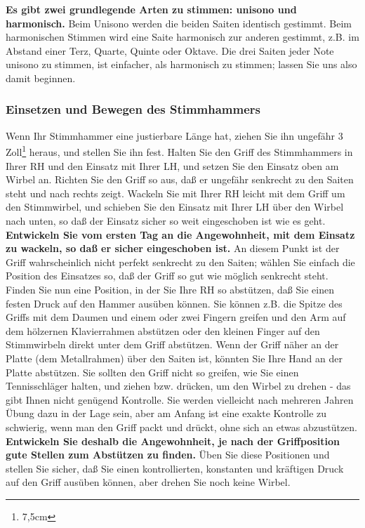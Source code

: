 \textbf{Es gibt zwei grundlegende Arten zu stimmen: unisono und harmonisch.}
Beim Unisono werden die beiden Saiten identisch gestimmt.
Beim harmonischen Stimmen wird eine Saite harmonisch zur anderen gestimmt, z.B. im Abstand einer Terz, Quarte, Quinte oder Oktave.
Die drei Saiten jeder Note unisono zu stimmen, ist einfacher, als harmonisch zu stimmen; lassen Sie uns also damit beginnen.
 

\label{c2_5b}
\subsubsection{Einsetzen und Bewegen des Stimmhammers}
\label{c2_5_hamm} 

Wenn Ihr Stimmhammer eine justierbare Länge hat, ziehen Sie ihn ungefähr 3 Zoll\footnote{7,5cm} heraus, und stellen Sie ihn fest.
Halten Sie den Griff des Stimmhammers in Ihrer RH und den Einsatz mit Ihrer LH, und setzen Sie den Einsatz oben am Wirbel an.
Richten Sie den Griff so aus, daß er ungefähr senkrecht zu den Saiten steht und nach rechts zeigt.
Wackeln Sie mit Ihrer RH leicht mit dem Griff um den Stimmwirbel, und schieben Sie den Einsatz mit Ihrer LH über den Wirbel nach unten, so daß der Einsatz sicher so weit eingeschoben ist wie es geht.
\textbf{Entwickeln Sie vom ersten Tag an die Angewohnheit, mit dem Einsatz zu wackeln, so daß er sicher eingeschoben ist.}
An diesem Punkt ist der Griff wahrscheinlich nicht perfekt senkrecht zu den Saiten; wählen Sie einfach die Position des Einsatzes so, daß der Griff so gut wie möglich senkrecht steht.
Finden Sie nun eine Position, in der Sie Ihre RH so abstützen, daß Sie einen festen Druck auf den Hammer ausüben können.
Sie können z.B. die Spitze des Griffs mit dem Daumen und einem oder zwei Fingern greifen und den Arm auf dem hölzernen Klavierrahmen abstützen oder den kleinen Finger auf den Stimmwirbeln direkt unter dem Griff abstützen.
Wenn der Griff näher an der Platte (dem Metallrahmen) über den Saiten ist, könnten Sie Ihre Hand an der Platte abstützen.
Sie sollten den Griff nicht so greifen, wie Sie einen Tennisschläger halten, und ziehen bzw. drücken, um den Wirbel zu drehen - das gibt Ihnen nicht genügend Kontrolle.
Sie werden vielleicht nach mehreren Jahren Übung dazu in der Lage sein, aber am Anfang ist eine exakte Kontrolle zu schwierig, wenn man den Griff packt und drückt, ohne sich an etwas abzustützen.
\textbf{Entwickeln Sie deshalb die Angewohnheit, je nach der Griffposition gute Stellen zum Abstützen zu finden.}
Üben Sie diese Positionen und stellen Sie sicher, daß Sie einen kontrollierten, konstanten und kräftigen Druck auf den Griff ausüben können, aber drehen Sie noch keine Wirbel.

